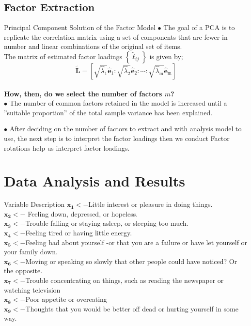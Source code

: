 \documentclass{beamer}
\begin{document}
\subsection{Factor Extraction}
\begin{frame}{Principal Component Solution of the Factor Model}
$\bullet$ The goal of a PCA is to replicate the correlation matrix using a set of components that are fewer in number and linear combinations of the original set of items. \\
The matrix of estimated factor loadings $\left\{\tilde{\ell}_{i j}\right\}$ is given by;
	\begin{equation}
		\tilde{\mathbf{L}}=\left[\sqrt{\hat{\lambda}_1} \hat{\mathbf{e}}_1: \sqrt{\hat{\lambda}_2} \hat{\mathbf{e}}_2: \cdots: \sqrt{\hat{\lambda}_{\mathrm{m}}} \hat{\mathbf{e}}_{\mathrm{m}}\right]
	\end{equation}\\
\vspace{2mm}
\textbf{How, then, do we select the number of factors $m$?}\\

$\bullet$ The number of common factors retained in the model is increased until a ”suitable proportion” of the total sample variance has been explained.

$\bullet$ After deciding on the number of factors to extract and with analysis model to use, the next step is to interpret the factor loadings then we conduct Factor rotations help us interpret factor loadings.
\end{frame}
\section{Data Analysis and Results}
\begin{frame}{Variable Description}
$\mathbf{x_1<-}$Little interest or pleasure in doing things.\\
$\mathbf{x_2<-}$ Feeling down, depressed, or hopeless.\\
$\mathbf{x_3<-}$Trouble falling or staying asleep, or sleeping too much.\\
$\mathbf{x_4<-}$Feeling tired or having little energy.\\
$\mathbf{x_5<-}$Feeling bad about yourself -or that you are a failure or have let yourself or your family down.\\
$\mathbf{x_6<-}$Moving or speaking so slowly that other people could have noticed? Or the opposite.\\
$\mathbf{x_7<-}$Trouble concentrating on things, such as reading the newspaper or watching television\\
$\mathbf{x_8<-}$Poor appetite or overeating\\
$\mathbf{x_9<-}$Thoughts that you would be better off dead or hurting yourself in some way.
\end{frame}
\end{document}

